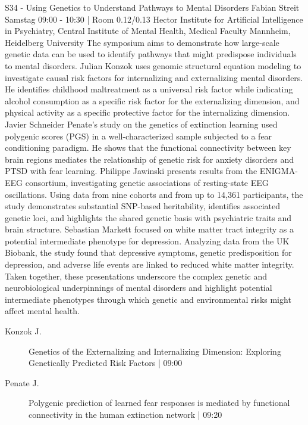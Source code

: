 
            \begin{symposium}
            {S34 - Using Genetics to Understand Pathways to Mental Disorders}
            {Fabian Streit}
            {Samstag 09:00 - 10:30 | Room 0.12/0.13}
            {Hector Institute for Artificial Intelligence in Psychiatry, Central Institute of Mental Health, Medical Faculty Mannheim, Heidelberg University}
            The symposium aims to demonstrate how large-scale genetic data can be used to identify pathways that might predispose individuals to mental disorders.
Julian Konzok uses genomic structural equation modeling to investigate causal risk factors for internalizing and externalizing mental disorders. He identifies childhood maltreatment as a universal risk factor while indicating alcohol consumption as a specific risk factor for the externalizing dimension, and physical activity as a specific protective factor for the internalizing dimension.
Javier Schneider Penate's study on the genetics of extinction learning used polygenic scores (PGS) in a well-characterized sample subjected to a fear conditioning paradigm. He shows that the functional connectivity between key brain regions mediates the relationship of genetic risk for anxiety disorders and PTSD with fear learning.
Philippe Jawinski presents results from the ENIGMA-EEG consortium, investigating genetic associations of resting-state EEG oscillations. Using data from nine cohorts and from up to 14,361 participants, the study demonstrates substantial SNP-based heritability, identifies associated genetic loci, and highlights the shared genetic basis with psychiatric traits and brain structure.
Sebastian Markett focused on white matter tract integrity as a potential intermediate phenotype for depression. Analyzing data from the UK Biobank, the study found that depressive symptoms, genetic predisposition for depression, and adverse life events are linked to reduced white matter integrity.
Taken together, these presentations underscore the complex genetic and neurobiological underpinnings of mental disorders and highlight potential intermediate phenotypes through which genetic and environmental risks might affect mental health.
            \begin{description}    
            
                \item [ Konzok J.] Genetics of the Externalizing and Internalizing Dimension: Exploring Genetically Predicted Risk Factors \textcolor{mygray}{ | 09:00}    
                
                \item [ Penate J.] Polygenic prediction of learned fear responses is mediated by functional connectivity in the human extinction network \textcolor{mygray}{ | 09:20}    
                

\end{description}
\end{symposium}
